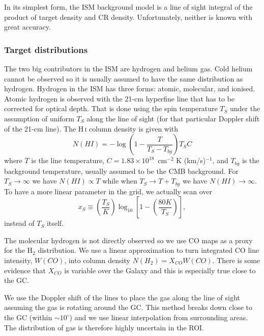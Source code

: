 \documentclass{article}
\begin{document}
   In its simplest form, the ISM background model is a line of sight integral
   of the product of target density and CR density.  Unfortunately, neither is
   known with great accuracy.

\subsubsection*{Target distributions}

   The two big contributors in the ISM are hydrogen and helium gas.  Cold helium
   cannot be observed so it is usually assumed to have the same distribution
   as hydrogen.  Hydrogen in the ISM has three forms: atomic, molecular, and
   ionised.  Atomic hydrogen is observed with the 21-cm hyperfine line that has to
   be corrected for optical depth.  That is done using the spin temperature
   $T_S$ under the assumption of uniform $T_S$ along the line of sight (for
   that particular Doppler shift of the 21-cm line).  The H\,\textsc{i} column density is
   given with
   \begin{equation}
      N(HI) = -\log\left(1-\frac{T}{T_S - T_{bg}}\right) T_S C
      \label{eq:spinTemperature}
   \end{equation}
   where $T$ is the line temperature, $C = 1.83\times10^{18}$~cm$^{-2}$ K
   (km/s)$^{-1}$, and $T_{bg}$ is the
   background temperature, usually assumed to be the CMB background.  For $T_S
   \rightarrow \infty$ we have $N(HI) \propto T$ while when $T_S \rightarrow
   T+T_{bg}$ we have $N(HI) \rightarrow \infty$.  To have a more linear
   parameter in the grid, we actually scan over
   \begin{equation}
    x_S \equiv \left(\frac{T_S}{K}\right)\log_{10}\left[1-\left(\frac{80K}{T_S}\right)\right],
   \end{equation}
   instead of $T_S$ itself.

   The molecular hydrogen is not directly observed so we use CO maps as a proxy for the H$_2$ distribution.
   We use a linear approximation to turn integrated CO line intensity, $W(CO)$,
   into column density $N(H_2) = X_{CO} W(CO)$.  There is some evidence that
   $X_{CO}$ is variable over the Galaxy and this is especially true close to
   the GC.

   We use the Doppler shift of the lines to place the gas along the line of
   sight assuming the gas is rotating around the GC.  This method breaks down
   close to the GC (within $\sim 10^\circ$) and we use linear interpolation
   from surrounding areas.  The distribution of gas is therefore highly
   uncertain in the ROI.
\end{document}
